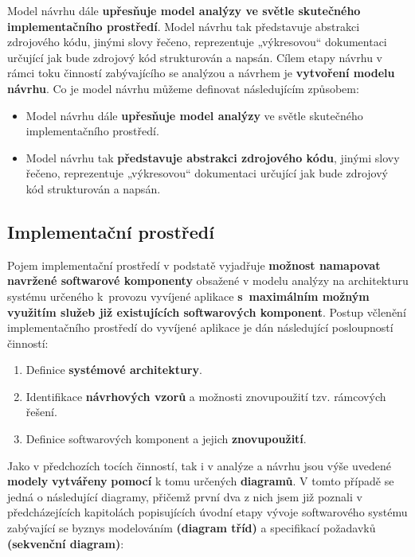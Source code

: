 Model návrhu dále \textbf{upřesňuje model analýzy ve světle skutečného implementačního prostředí}. Model návrhu tak představuje abstrakci zdrojového kódu, jinými slovy řečeno, reprezentuje „výkresovou“ dokumentaci určující jak bude zdrojový kód strukturován a napsán. Cílem etapy návrhu v rámci toku činností zabývajícího se analýzou a návrhem je \textbf{vytvoření modelu návrhu}. Co je model návrhu můžeme definovat následujícím způsobem:
\begin{itemize}
\item Model návrhu dále \textbf{upřesňuje model analýzy} ve světle skutečného implementačního prostředí.
\item Model návrhu tak \textbf{představuje abstrakci zdrojového kódu}, jinými slovy řečeno, reprezentuje „výkresovou“ dokumentaci určující jak bude zdrojový kód strukturován a napsán. 
\end{itemize}

\subsection{Implementační prostředí}
Pojem implementační prostředí v podstatě vyjadřuje \textbf{možnost namapovat navržené softwarové komponenty} obsažené v modelu analýzy na architekturu systému určeného k provozu vyvíjené aplikace \textbf{s maximálním možným využitím služeb již existujících softwarových komponent}. Postup včlenění implementačního prostředí do vyvíjené aplikace je dán následující posloupností činností:
\begin{enumerate}
\item Definice \textbf{systémové architektury}.
\item Identifikace \textbf{návrhových vzorů} a možnosti znovupoužití tzv. rámcových řešení.
\item Definice softwarových komponent a jejich \textbf{znovupoužití}.
\end{enumerate}
Jako v předchozích tocích činností, tak i v analýze a návrhu jsou výše uvedené \textbf{modely} \textbf{vytvářeny} \textbf{pomocí} k tomu určených \textbf{diagramů}. V tomto případě se jedná o následující diagramy, přičemž první dva z nich jsem již poznali v předcházejících kapitolách popisujících úvodní etapy vývoje softwarového systému zabývající se byznys modelováním \textbf{(diagram tříd) }a specifikací požadavků \textbf{(sekvenční diagram)}:

